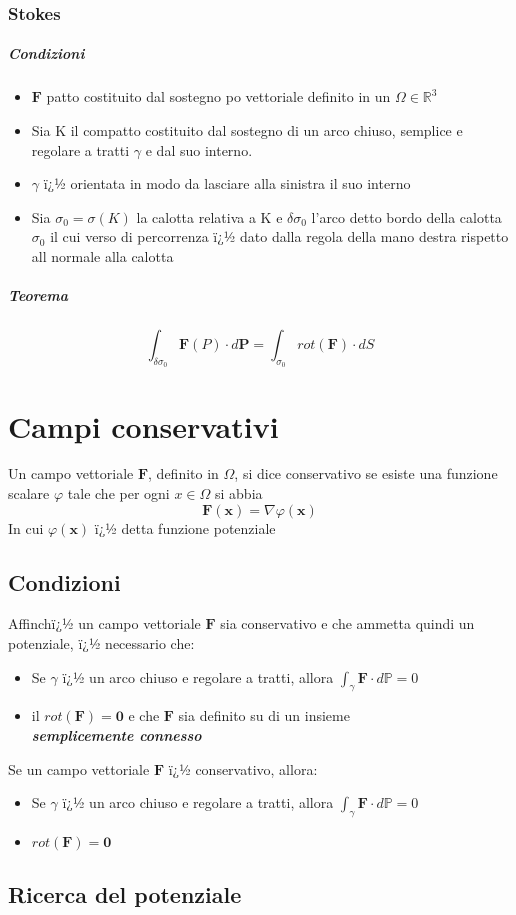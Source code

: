 \documentclass[10pt,a4paper]{report}
\begin{document}
			\subsubsection{Stokes}
			
				\subparagraph{Condizioni}
				\begin{itemize}
					\item $\mathbf{F}$ patto costituito dal sostegno po vettoriale definito in un $ \Omega \in \mathbb{R}^{3} $
					\item Sia K il compatto costituito dal sostegno di un arco chiuso, semplice e regolare a tratti $ \gamma $ e dal suo interno.
					\item $ \gamma $ ï¿½ orientata in modo da lasciare alla sinistra il suo interno
					\item Sia $ \sigma_{0} = \sigma(K) $ la calotta relativa a K e $ \delta \sigma_{0} $ l'arco detto bordo della calotta $ \sigma_{0} $  il cui verso di percorrenza ï¿½ dato dalla regola della mano destra  rispetto all normale alla calotta
				\end{itemize}
				\subparagraph{Teorema}
				\[ \int_{\delta \sigma_{0}} \mathbf{F}(P) \cdot d \mathbf{P} = \int_{ \sigma_{0}} rot(\mathbf{F}) \cdot d S\]




	
	\section*{Campi conservativi}
	
			Un campo vettoriale $ \mathbf{F} $, definito in $ \Omega $, si dice conservativo se 
			esiste una funzione scalare $ \varphi $ tale che per ogni $ x \in \Omega $ si abbia \[ \mathbf{F}(\mathbf{x}) = \nabla \varphi(\mathbf{x})\] In cui $ \varphi(\mathbf{x}) $ ï¿½ detta funzione potenziale
			
			\subsection*{Condizioni}
			Affinchï¿½ un campo vettoriale $ \mathbf{F} $ sia conservativo e che ammetta quindi un potenziale, ï¿½ necessario che:
			\begin{itemize}
				\item Se $ \gamma $ ï¿½ un arco chiuso e regolare a tratti, allora $ \int_{\gamma } \mathbf{F} \cdot d\mathbb{P}  =  0$
				\item il $ rot(\mathbf{F}) = \textbf{0} $ e che $ \mathbf{F} $ sia definito su di un insieme \\ \textit{\textbf{semplicemente connesso}}
			\end{itemize}
			Se un campo vettoriale $ \mathbf{F} $ ï¿½ conservativo, allora:
			\begin{itemize}
				\item Se $ \gamma $ ï¿½ un arco chiuso e regolare a tratti, allora $ \int_{\gamma } \mathbf{F} \cdot d\mathbb{P}  =  0$
				\item $ rot(\mathbf{F}) = \textbf{0} $
			\end{itemize}
			\subsection*{Ricerca del potenziale}
\end{document}

